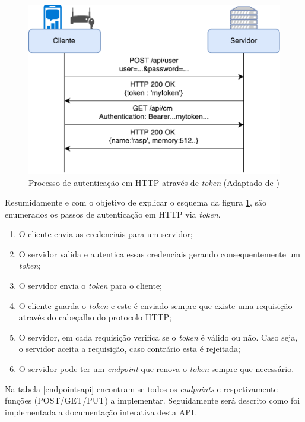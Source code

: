 \begin{figure}[h]
	\centering
	\includegraphics[scale=0.61]{esquemas/autenticacaohttpesquema.pdf}
	\caption[Processo de autenticação em \acs{HTTP} através de \textit{token}]{Processo de autenticação em \ac{HTTP} através de \textit{token} (Adaptado de \cite{AdoKukic2016})}
	\label{autnetAPI}
\end{figure}


Resumidamente e com o objetivo de explicar o esquema da figura \ref{autnetAPI}, são enumerados os passos de autenticação em \ac{HTTP} via \textit{token}. 

\begin{enumerate}
	\item O cliente envia as credenciais para um servidor;
	\item O servidor valida e autentica essas credenciais gerando consequentemente um \textit{token};
	\item O servidor envia o \textit{token} para o cliente;
	\item O cliente guarda o \textit{token} e este é enviado sempre que existe uma requisição através do cabeçalho do protocolo HTTP; 
	\item O servidor, em cada requisição verifica se o \textit{token} é válido ou não. Caso seja, o servidor aceita a requisição, caso contrário esta é rejeitada;
	\item O servidor pode ter um \textit{endpoint} que renova o \textit{token} sempre que necessário. 
\end{enumerate}




Na tabela \ref{endpointsapi} encontram-se todos os \textit{endpoints} e respetivamente funções (POST/GET/PUT) a implementar. Seguidamente será descrito como foi implementada a documentação interativa desta \ac{API}.  


